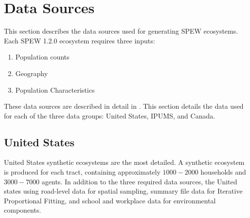 \documentclass[font=9pt]{article}
\begin{document}
\begin{table}[ht]
  \centering 
  \caption{The three data groups for current SPEW 1.2.0 synthetic ecosystems: U.S., IPUMS, and Canada. Count gives the total number of ecosystems in this group, level gives the size of each ecosystem, and region level gives the lowest region level generated \vspace{2em}}
  \label{tab:summary}
 \end{table}

\newpage 
\section{Data Sources}
\label{sec:data}
This section describes the data sources used for generating SPEW ecosystems. Each SPEW 1.2.0 ecosystem requires three inputs:

\begin{enumerate}
	\item Population counts
	\item Geography 
	\item Population Characteristics
\end{enumerate}

These data sources are described in detail in \cite{spew}. This section details the data used for each of the three data groups: United States, IPUMS, and Canada. 

\subsection{United States}	
United States synthetic ecosystems are the most detailed. A synthetic ecosystem is produced for each tract, containing approximately $1000-2000$ households and $3000-7000$ agents. In addition to the three required data sources, the United states using road-level data for spatial sampling, summary file data for Iterative Proportional Fitting, and school and workplace data for environmental components. 
\end{document}
